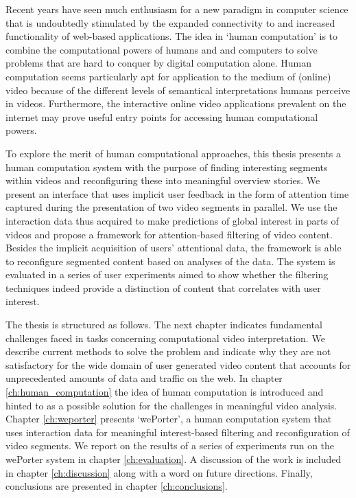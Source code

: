 Recent years have seen much enthusiasm for a new paradigm in computer science that is undoubtedly stimulated by the expanded connectivity to and increased functionality of web-based applications. The idea in `human computation' is to combine the computational powers of humans and and computers to solve problems that are hard to conquer by digital computation alone\cite{vonAhn:2005wi}. Human computation seems particularly apt for application to the medium of (online) video because of the different levels of semantical interpretations humans perceive in videos. Furthermore, the interactive online video applications prevalent on the internet may prove useful entry points for accessing human computational powers.

To explore the merit of human computational approaches, this thesis presents a human computation system with the purpose of finding interesting segments within videos and reconfiguring these into meaningful overview stories. We present an interface that uses implicit user feedback in the form of attention time captured during the presentation of two video segments in parallel. We use the interaction data thus acquired to make predictions of global interest in parts of videos and propose a framework for attention-based filtering of video content. Besides the implicit acquisition of users' attentional data, the framework is able to reconfigure segmented content based on analyses of the data. The system is evaluated in a series of user experiments aimed to show whether the filtering techniques indeed provide a distinction of content that correlates with user interest.

The thesis is structured as follows. The next chapter indicates fundamental challenges faced in tasks concerning computational video interpretation. We describe current methods to solve the problem and indicate why they are not satisfactory for the wide domain of user generated video content that accounts for unprecedented amounts of data and traffic on the web. In chapter \ref{ch:human_computation} the idea of human computation is introduced and hinted to as a possible solution for the challenges in meaningful video analysis. Chapter \ref{ch:weporter} presents `wePorter', a human computation system that uses interaction data for meaningful interest-based filtering and reconfiguration of video segments. We report on the results of a series of experiments run on the wePorter system in chapter \ref{ch:evaluation}. A discussion of the work is included in chapter \ref{ch:discussion} along with a word on future directions. Finally, conclusions are presented in chapter \ref{ch:conclusions}.


